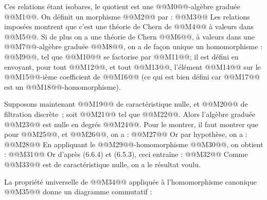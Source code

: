 

Ces
relations étant isobares, le quotient est une @@M0@@-algèbre graduée @@M1@@. On définit un morphisme @@M2@@ par :
@@M3@@
Les relations imposées montrent que c'est une théorie de Chern de @@M4@@ à valeurs dans @@M5@@. Si de plus on a une théorie de Chern @@M6@@, à valeurs dans une @@M7@@-algèbre graduée @@M8@@, on a de façon unique un homomorphisme : @@M9@@, tel que @@M10@@ se factorise par @@M11@@; il est défini en envoyant, pour tout @@M12@@, et tout @@M13@@, l'élément @@M14@@ sur le @@M15@@-ième coefficient de @@M16@@ (ce qui est bien défini car @@M17@@ est un @@M18@@-homomorphisme).

Supposons maintenant @@M19@@ de caractéristique nulle, et @@M20@@ de filtration discrète~; soit @@M21@@ tel que @@M22@@. Alors l'algèbre graduée @@M23@@ est nulle en degrés @@M24@@. Pour le montrer, il faut montrer que pour @@M25@@, et @@M26@@, on a :
@@M27@@
Or par hypothèse, on a :
@@M28@@
En appliquant le @@M29@@-homomorphisme @@M30@@, on obtient :
@@M31@@
Or d'après (6.6.4) et (6.5.3), ceci entraîne :
@@M32@@
Comme @@M33@@ est de caractéristique nulle, on a le résultat voulu.

La propriété universelle de @@M34@@ appliquée à l'homomorphisme canonique @@M35@@ donne un diagramme commutatif :
